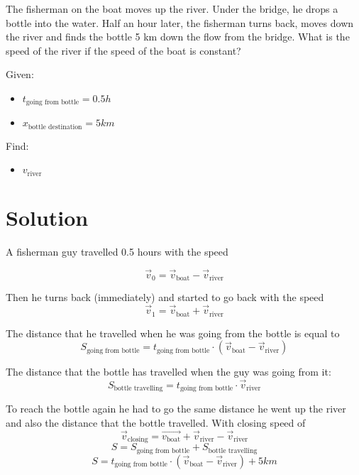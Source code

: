 The fisherman on the boat moves up the river. Under the bridge, he drops a bottle into the water.
Half an hour later, the fisherman turns back, moves down the river and finds the bottle 5 km
down the flow from the bridge. What is the speed of the river if the speed of the boat is constant?

\bigbreak Given: \begin{itemize}
    \item $t_{\text{going from bottle}} = 0.5h$
    \item $x_{\text{bottle destination}} = 5km$
\end{itemize}

Find: \begin{itemize}
    \item $v_{\text{river}}$
\end{itemize}

\section*{Solution}

A fisherman guy travelled 0.5 hours with the speed

$$\Vec{v}_0 = \Vec{v}_{\text{boat}} - \Vec{v}_{\text{river}}$$

Then he turns back (immediately) and started to go back with the speed
\begin{equation}
    \label{eq:1}
    \Vec{v}_1 = \Vec{v}_{\text{boat}} + \Vec{v}_{\text{river}}
\end{equation}

The distance that he travelled when he was going from the bottle is equal to
$$S_{\text{going from bottle}} = t_{\text{going from bottle}} \cdot (\Vec{v}_{\text{boat}} - \Vec{v}_{\text{river}})$$

The distance that the bottle has travelled when the guy was going from it:
$$S_{\text{bottle travelling}} = t_{\text{going from bottle}} \cdot \Vec{v}_{\text{river}}$$

To reach the bottle again he had to go the same distance he went up the river and also the distance that the bottle travelled.
With closing speed of $$\Vec{v}_\text{closing} = \Vec{v_\text{boat}} + \Vec{v}_\text{river} - \Vec{v}_\text{river}$$
$$S = S_{\text{going from bottle}} + S_{\text{bottle travelling}}$$
\begin{equation}
    \label{eq:2}
    S = t_{\text{going from bottle}} \cdot (\Vec{v}_{\text{boat}} - \Vec{v}_{\text{river}}) + 5km
\end{equation}

